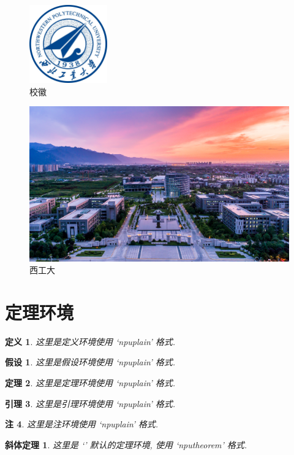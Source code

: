 \documentclass[twoside, UTF8, phd, AutoFakeBold]{nputhesis}
\theoremstyle{npuplain}
\newtheorem{theorem}{定理}[section]
\newtheorem{lemma}[theorem]{引理}
\newtheorem{remark}[theorem]{注}
\newtheorem{definition}[theorem]{定义}
\newtheorem{assumption}{假设}
\theoremstyle{nputheorem}
\newtheorem{npu-thm}{斜体定理}[section]
\begin{document}
\begin{figure}[h!]
    \centering
    \includegraphics[width=0.3\textwidth]{figures/nwpu.jpg}
    \caption{校徽}
\end{figure}

\lipsum[2]

\begin{figure}[h!]
    \centering
    \includegraphics[width=.8\textwidth]{figures/campus.jpg}
    \caption{西工大}
\end{figure}
\lipsum[2]


\section{定理环境}
\begin{definition}
  这里是定义环境使用 `npuplain' 格式.
\end{definition}
\begin{assumption}
  这里是假设环境使用 `npuplain' 格式.
\end{assumption}
\begin{theorem}
  这里是定理环境使用 `npuplain' 格式.
\end{theorem}
\begin{lemma}
  这里是引理环境使用 `npuplain' 格式.
\end{lemma}
\begin{remark}
  这里是注环境使用 `npuplain' 格式.
\end{remark}
\begin{npu-thm}
  这里是 `' 默认的定理环境, 使用 `nputheorem' 格式.
\end{npu-thm}
\end{document}
